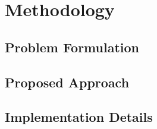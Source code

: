 \section{Methodology}
\label{sec:methodology}

\subsection{Problem Formulation}

\subsection{Proposed Approach}


\subsection{Implementation Details}
